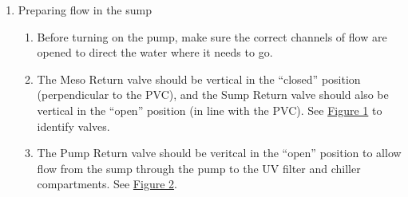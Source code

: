 \documentclass[
]{book}
\providecommand{\tightlist}{%
  \setlength{\itemsep}{0pt}\setlength{\parskip}{0pt}}
\begin{document}
\begin{enumerate}
\def\labelenumi{\arabic{enumi}.}
\tightlist
\item
  Preparing flow in the sump

  \begin{enumerate}
  \def\labelenumii{\arabic{enumii}.}
  \tightlist
  \item
    Before turning on the pump, make sure the correct channels of flow are opened to direct the water where it needs to go.
  \item
    The Meso Return valve should be vertical in the ``closed'' position (perpendicular to the PVC), and the Sump Return valve should also be vertical in the ``open'' position (in line with the PVC). See \protect\hyperlink{Figure1}{Figure 1} to identify valves.
  \item
    The Pump Return valve should be veritcal in the ``open'' position to allow flow from the sump through the pump to the UV filter and chiller compartments. See \protect\hyperlink{Figure2}{Figure 2}.


\end{enumerate}
\end{enumerate}
\end{document}
